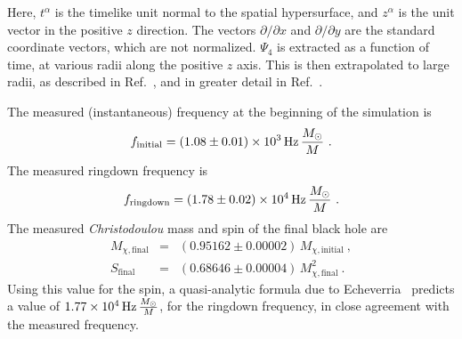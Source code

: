 Here, $t^{\alpha}$ is the timelike unit normal to the spatial
hypersurface, and $z^{\alpha}$ is the unit vector in the positive $z$
direction.  The vectors $\partial/\partial x$ and $\partial/\partial
y$ are the standard coordinate vectors, which are not normalized.
$\Psi_{4}$ is extracted as a function of time, at various radii along
the positive $z$ axis.  This is then extrapolated to large radii, as
described in Ref.~\cite{Boyle2007}, and in greater detail in
Ref.~\cite{Boyle2008}.


The measured (instantaneous) frequency at the beginning of the
simulation is
\begin{equation}
  \label{eq:MeasuredStartingFreq}
  f_{\mathrm{initial}} = \unit[(1.08 \pm 0.01) \times 10^{3}]{Hz}\,
  \frac{\MSun}{M}\ .
\end{equation}
The measured ringdown frequency is
\begin{equation}
  \label{eq:MeasuredRingdownFreq}
  f_{\mathrm{ringdown}} = \unit[(1.78 \pm 0.02) \times 10^{4}]{Hz}\,
  \frac{\MSun}{M}\ .
\end{equation}
The measured \emph{Christodoulou} mass and spin of the final black
hole are
\begin{eqnarray}
  \label{eq:MeasuredFinalMass}
  M_{\chi\mathrm{, final}} &= &(0.95162 \pm 0.00002)\, M_{\chi\mathrm{,
      initial}}\ , \\
  \label{eq:MeasuredFinalSpin}
  S_{\mathrm{final}} &= &(0.68646 \pm 0.00004)\, M^{2}_{\chi\mathrm{, final}}\ .
\end{eqnarray}
Using this value for the spin, a quasi-analytic formula due to
Echeverria~\cite{Echeverria1989} predicts a value of
$\unit[1.77\times10^{4}]{Hz}\, \frac{\MSun}{M}$, for the ringdown
frequency, in close agreement with the measured frequency.

